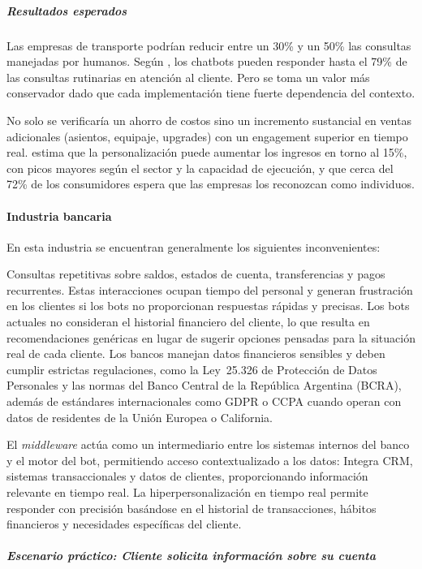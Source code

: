 \subparagraph{Resultados esperados}

Las empresas de transporte podrían reducir entre un 30\% y un 50\% las consultas manejadas por humanos. Según \textcite{Botpress2024}, los chatbots pueden responder hasta el 79\% de las consultas rutinarias en atención al cliente. Pero se toma un valor más conservador dado que cada implementación tiene fuerte dependencia del contexto.

No solo se verificaría un ahorro de costos sino un incremento sustancial en ventas adicionales (asientos, equipaje, upgrades) con un engagement superior en tiempo real. \textcite{McKinsey2021} estima que la personalización puede aumentar los ingresos en torno al 15\%, con picos mayores según el sector y la capacidad de ejecución, y que cerca del 72\% de los consumidores espera que las empresas los reconozcan como individuos.

\paragraph{Industria bancaria}

En esta industria se encuentran generalmente los siguientes inconvenientes:

Consultas repetitivas sobre saldos, estados de cuenta, transferencias y pagos recurrentes. Estas interacciones ocupan tiempo del personal y generan frustración en los clientes si los bots no proporcionan respuestas rápidas y precisas. Los bots actuales no consideran el historial financiero del cliente, lo que resulta en recomendaciones genéricas en lugar de sugerir opciones pensadas para la situación real de cada cliente. Los bancos manejan datos financieros sensibles y deben cumplir estrictas regulaciones, como la Ley~25.326 de Protección de Datos Personales y las normas del Banco Central de la República Argentina (BCRA), además de estándares internacionales como GDPR o CCPA cuando operan con datos de residentes de la Unión Europea o California.

El \textit{middleware} actúa como un intermediario entre los sistemas internos del banco y el motor del bot, permitiendo acceso contextualizado a los datos: Integra CRM, sistemas transaccionales y datos de clientes, proporcionando información relevante en tiempo real. La hiperpersonalización en tiempo real permite responder con precisión basándose en el historial de transacciones, hábitos financieros y necesidades específicas del cliente.

\subparagraph{Escenario práctico: Cliente solicita información sobre su cuenta}

